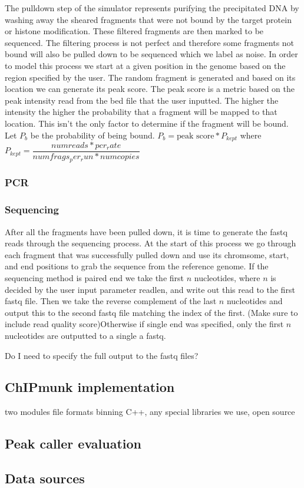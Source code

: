 \documentclass[12pt]{article}
\begin{document}
The pulldown step of the simulator represents purifying the precipitated DNA by washing away the sheared fragments that were not bound by the target protein or histone modification. These filtered fragments are then marked to be sequenced. The filtering process is not perfect and therefore some fragments not bound will also be pulled down to be sequenced which we label as noise. In order to model this process we start at a given position in the genome based on the region specified by the user. The random fragment is generated and based on its location we can generate its peak score. The peak score is a metric based on the peak intensity read from the bed file that the user inputted. The higher the intensity the higher the probability that a fragment will be mapped to that location. This isn't the only factor to determine if the fragment will be bound. Let $P_b$ be the probability of being bound. 
$P_b = \text{peak score} * P_{kept}$ where $P_{kept} = \dfrac{numreads * pcr_rate}{numfrags_per_run * numcopies}$

\subsubsection*{PCR}

\subsubsection*{Sequencing}

After all the fragments have been pulled down, it is time to generate the fastq reads through the sequencing process. At the start of this process we go through each fragment that was successfully pulled down and use its chromsome, start, and end positions to grab the sequence from the reference genome. If the sequencing method is paired end we take the first $n$ nucleotides, where $n$ is decided by the user input parameter readlen, and write out this read to the first fastq file. Then we take the reverse complement of the last $n$ nucleotides and output this to the second fastq file matching the index of the first. (Make sure to include read quality score)Otherwise if single end was specified, only the first $n$ nucleotides are outputted to a single a fastq. 

Do I need to specify the full output to the fastq files?

\subsection*{ChIPmunk implementation}

two modules
file formats
binning
C++, any special libraries we use, open source

\subsection*{Peak caller evaluation}

\subsection*{Data sources}
\end{document}
